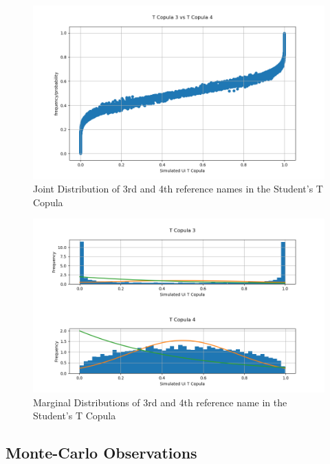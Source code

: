 \documentclass{report}
\theoremstyle{plain}
\theoremstyle{definition}
\begin{document}
\begin{figure}[H]
	\begin{center}
		\includegraphics[width=15cm]{T_Copula_3_vs_T_Copula_4.png}
		\caption{Joint Distribution of 3rd and 4th reference names in the Student's T Copula} 
		\label{T_Copula_3_vs_T_Copula_4}
	\end{center}
\end{figure}

\begin{figure}[H]
	\begin{center}
		\includegraphics[width=15cm]{T_Copula_3.png}
		\caption{Marginal Distributions of 3rd and 4th reference name in the Student's T Copula} 
		\label{T_Copula_3}
	\end{center}
\end{figure}


\subsection{Monte-Carlo Observations}
\end{document}
